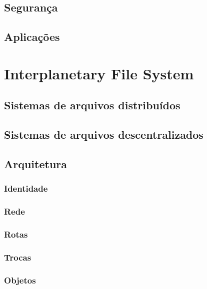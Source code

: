 \documentclass[tcc,capa]{texufpel}
\begin{document}
	\subsection{Segurança}
	
	
    
    \subsection{Aplicações}
    
\section{Interplanetary File System}

	\subsection{Sistemas de arquivos distribuídos}
    
    \subsection{Sistemas de arquivos descentralizados}

	\subsection{Arquitetura}
    
    	\subsubsection{Identidade}
        
        \subsubsection{Rede}
        
        \subsubsection{Rotas}
        
        \subsubsection{Trocas}
        
        \subsubsection{Objetos}
        
\end{document}
